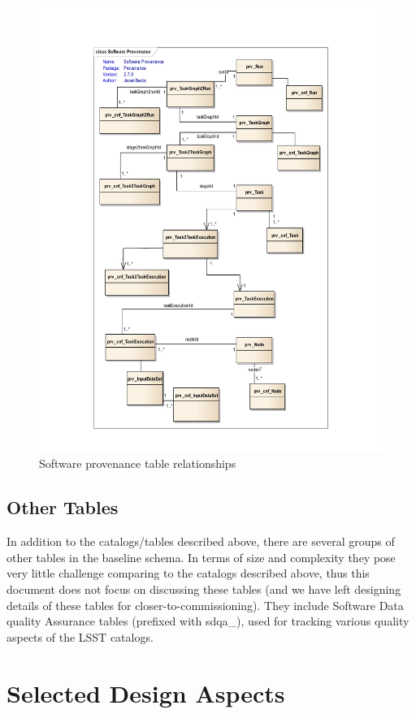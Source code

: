 \documentclass[DM,lsstdraft,toc]{lsstdoc}
\begin{document}
\begin{figure}
  \centering\includegraphics[scale=0.70]{diagrams/software_provenance}
  \caption{Software provenance table relationships}
\end{figure}

\subsection{Other Tables}

In addition to the catalogs/tables described above, there are several groups of other tables in the baseline schema. In terms of size and complexity they pose very little challenge comparing to the catalogs described above, thus this document does not focus on discussing these tables (and we have left designing details of these tables for closer-to-commissioning). They include Software Data quality Assurance tables (prefixed with sdqa\_), used for tracking various quality aspects of the LSST catalogs.

\section{Selected Design Aspects}
\end{document}
